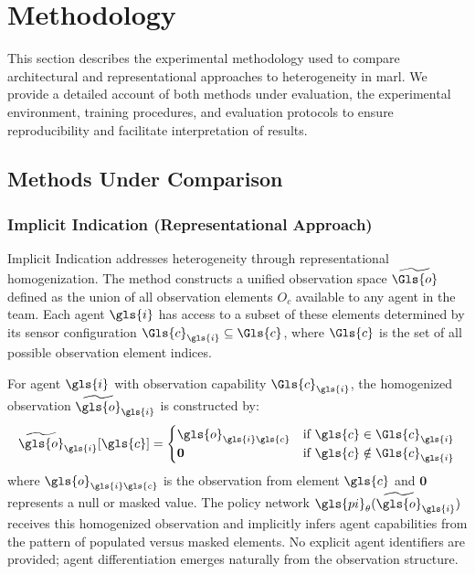 \documentclass[conference]{IEEEtran}
\newcommand{\Hom}[1]{\widetilde{#1}}
\begin{document}
\section{Methodology}

This section describes the experimental methodology used to compare architectural and 
representational approaches to heterogeneity in \gls{marl}.
We provide a detailed account of both methods under evaluation, the experimental environment, 
training procedures, and evaluation protocols to ensure reproducibility and facilitate 
interpretation of results.

\subsection{Methods Under Comparison}

\subsubsection{Implicit Indication (Representational Approach)}

Implicit Indication addresses heterogeneity through representational homogenization.
The method constructs a unified observation space \(\Hom{\Gls{o}}\)
defined as the union of all observation elements $O_c$ available to any agent in the team. 
Each agent \(\gls{i}\) has access to a subset of these elements determined by its sensor 
configuration \(\Gls{c}_{\gls{i}} \subseteq \Gls{c}\), 
where \(\Gls{c}\) is the set of all possible observation element indices.

For agent \(\gls{i}\) with observation capability \(\Gls{c}_{\gls{i}}\), 
the homogenized observation \(\Hom{\gls{o}}_{\gls{i}}\) is constructed by:
\begin{equation*}
    \Hom{\gls{o}}_{\gls{i}}[\gls{c}] =
    \begin{cases}
        \gls{o}_{\gls{i}\gls{c}} & \text{if } \gls{c}\in\Gls{c}_{\gls{i}} \\
        \mathbf{0} & \text{if } \gls{c} \notin\Gls{c}_{\gls{i}}
    \end{cases}
\end{equation*}
where \(\gls{o}_{\gls{i}\gls{c}}\) is the observation from element 
\(\gls{c}\) and \(\mathbf{0}\) represents a null or masked value. 
The policy network \(\gls{pi}_\theta(\Hom{\gls{o}}_{\gls{i}})\)
receives this homogenized observation and implicitly infers agent 
capabilities from the pattern of populated versus masked elements. 
No explicit agent identifiers are provided; agent differentiation emerges 
naturally from the observation structure.
\end{document}
